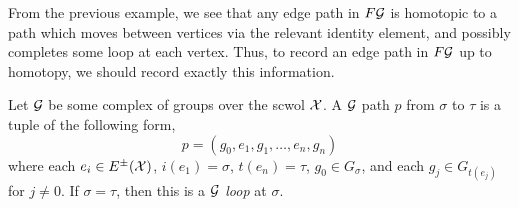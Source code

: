 From the previous example, we see that any edge path in $F\mathcal{G}$ is homotopic to a path which moves between vertices via the relevant identity element, and possibly completes some loop at each vertex.
Thus, to record an edge path in $F\mathcal{G}$ up to homotopy, we should record exactly this information.

\begin{definition}
	Let $\mathcal{G}$ be some complex of groups over the scwol $\mathcal{X}$.
	A $\mathcal{G}$ path $p$ from $\sigma$ to  $\tau$ is a tuple of the following form,
	\[
		p = (g_0, e_1, g_1, \ldots ,e_n, g_n)
	\]
	where each $e_i \in E^\pm(\mathcal{X})$, $i(e_1) = \sigma$, $t(e_n)=\tau$, $g_0 \in G_\sigma$, and each $g_j \in G_{t(e_j)}$ for  $j \neq 0$.
	If $\sigma=\tau$, then this is a \emph{ $\mathcal{G}$ loop} at  $\sigma$.
	\label{def:paths_in_complexes_of_groups}
\end{definition}

